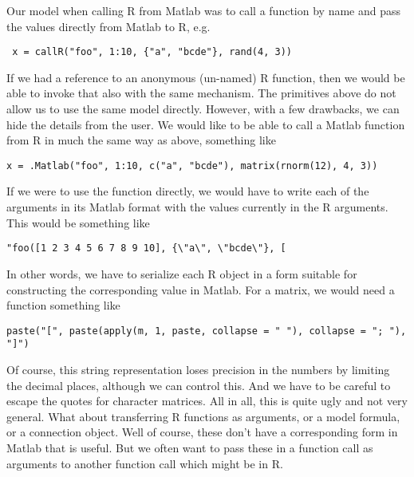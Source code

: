 \documentclass{article}
\begin{document}
Our model when calling R from Matlab was to 
call a function by name and pass the values directly from Matlab to R,
e.g.
\begin{verbatim}
 x = callR("foo", 1:10, {"a", "bcde"}, rand(4, 3))
\end{verbatim}
If we had a reference to an anonymous (un-named) R function, then
we would be able to invoke that also with the same mechanism.
The primitives above do not allow us to use the same
model directly. However, with a few drawbacks, we can hide
the details from the user.
We would like to be able to call a Matlab function from
R in much the same way  as above, something like
\begin{verbatim}
x = .Matlab("foo", 1:10, c("a", "bcde"), matrix(rnorm(12), 4, 3))
\end{verbatim}

If we were to use the  function directly,
we would have to write each of the arguments in
its Matlab format with the values currently in the R arguments.
This would be something like
\begin{verbatim}
"foo([1 2 3 4 5 6 7 8 9 10], {\"a\", \"bcde\"}, [
\end{verbatim}

In other words, we have to serialize each R object in a form suitable
for constructing the corresponding value in Matlab.
For a matrix, we would need a function something like
\begin{verbatim}
paste("[", paste(apply(m, 1, paste, collapse = " "), collapse = "; "), "]")
\end{verbatim}
Of course, this string representation loses precision in the numbers
by limiting the decimal places, although we can control this.  And we
have to be careful to escape the quotes for character matrices.  All
in all, this is quite ugly and not very general.  What about
transferring R functions as arguments, or a model formula, or a
connection object.  Well of course, these don't have a corresponding
form in Matlab that is useful.  But we often want to pass these in a
function call as arguments to another function call which might be in
R.
\end{document}
